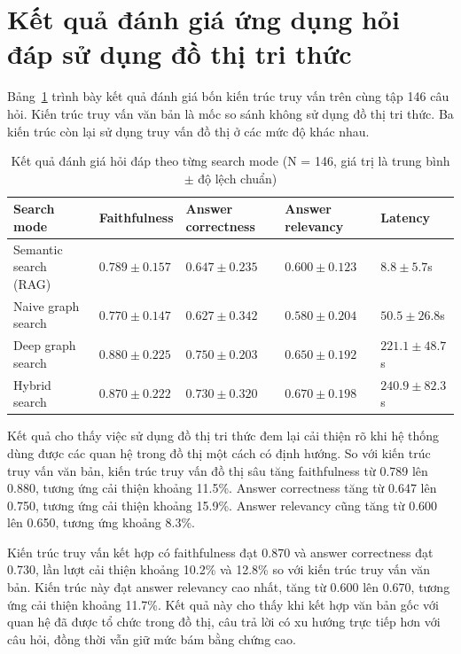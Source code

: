 \section{Kết quả đánh giá ứng dụng hỏi đáp sử dụng đồ thị tri thức}

Bảng~\ref{tab:rag_evaluation_metrics} trình bày kết quả đánh giá bốn kiến trúc truy vấn trên cùng tập 146 câu hỏi. Kiến trúc truy vấn văn bản là mốc so sánh không sử dụng đồ thị tri thức. Ba kiến trúc còn lại sử dụng truy vấn đồ thị ở các mức độ khác nhau.

\begin{table}[h]
\centering
\caption{Kết quả đánh giá hỏi đáp theo từng search mode (N = 146, giá trị là trung bình $\pm$ độ lệch chuẩn)}
\label{tab:rag_evaluation_metrics}
\begin{tabularx}{\textwidth}{|p{}|X|X|X|X|}
\hline
\textbf{Search mode} & \textbf{Faithfulness} & \textbf{Answer correctness} & \textbf{Answer relevancy} & \textbf{Latency} \\
\hline
Semantic search (RAG) & $0.789 \pm 0.157$ & $0.647 \pm 0.235$ & $0.600 \pm 0.123$ & $8.8 \pm 5.7$s \\
\hline
Naive graph search & $0.770 \pm 0.147$ & $0.627 \pm 0.342$ & $0.580 \pm 0.204$ & $50.5 \pm 26.8$s \\
\hline
Deep graph search & $0.880 \pm 0.225$ & $0.750 \pm 0.203$ & $0.650 \pm 0.192$ & $221.1 \pm 48.7$s \\
\hline
Hybrid search & $0.870 \pm 0.222$ & $0.730 \pm 0.320$ & $0.670 \pm 0.198$ & $240.9 \pm 82.3$s \\
\hline
\end{tabularx}
\end{table}

Kết quả cho thấy việc sử dụng đồ thị tri thức đem lại cải thiện rõ khi hệ thống dùng được các quan hệ trong đồ thị một cách có định hướng. So với kiến trúc truy vấn văn bản, kiến trúc truy vấn đồ thị sâu tăng faithfulness từ 0.789 lên 0.880, tương ứng cải thiện khoảng 11.5\%. Answer correctness tăng từ 0.647 lên 0.750, tương ứng cải thiện khoảng 15.9\%. Answer relevancy cũng tăng từ 0.600 lên 0.650, tương ứng khoảng 8.3\%.

Kiến trúc truy vấn kết hợp có faithfulness đạt 0.870 và answer correctness đạt 0.730, lần lượt cải thiện khoảng 10.2\% và 12.8\% so với kiến trúc truy vấn văn bản. Kiến trúc này đạt answer relevancy cao nhất, tăng từ 0.600 lên 0.670, tương ứng cải thiện khoảng 11.7\%. Kết quả này cho thấy khi kết hợp văn bản gốc với quan hệ đã được tổ chức trong đồ thị, câu trả lời có xu hướng trực tiếp hơn với câu hỏi, đồng thời vẫn giữ mức bám bằng chứng cao.

